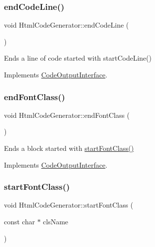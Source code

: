 \mbox{\label{class_html_code_generator_ab0909b2a97301c8da4fcbf83831c84b3}} 
\subsubsection{\texorpdfstring{endCodeLine()}{endCodeLine()}}
{\footnotesize\ttfamily void Html\+Code\+Generator\+::end\+Code\+Line (\begin{DoxyParamCaption}{ }\end{DoxyParamCaption})\hspace{0.3cm}{\ttfamily [virtual]}}

Ends a line of code started with start\+Code\+Line() 

Implements \mbox{\hyperlink{class_code_output_interface_afac5763eafc78f93b82691fb9a6dcff7}{Code\+Output\+Interface}}.

\mbox{\label{class_html_code_generator_a8efe5c697dc169b24b5e7da7cf54305e}} 
\subsubsection{\texorpdfstring{endFontClass()}{endFontClass()}}
{\footnotesize\ttfamily void Html\+Code\+Generator\+::end\+Font\+Class (\begin{DoxyParamCaption}{ }\end{DoxyParamCaption})\hspace{0.3cm}{\ttfamily [virtual]}}

Ends a block started with \mbox{\hyperlink{class_html_code_generator_ae7eaca4c34eeb6bf1aeaf0ac5ce4257b}{start\+Font\+Class()}} 

Implements \mbox{\hyperlink{class_code_output_interface_a2b8ac05a391dae36793aa3aa8714a0f6}{Code\+Output\+Interface}}.

\mbox{\label{class_html_code_generator_ae7eaca4c34eeb6bf1aeaf0ac5ce4257b}} 
\subsubsection{\texorpdfstring{startFontClass()}{startFontClass()}}
{\footnotesize\ttfamily void Html\+Code\+Generator\+::start\+Font\+Class (\begin{DoxyParamCaption}\item[{const char $\ast$}]{cls\+Name }\end{DoxyParamCaption})\hspace{0.3cm}{\ttfamily [virtual]}}


